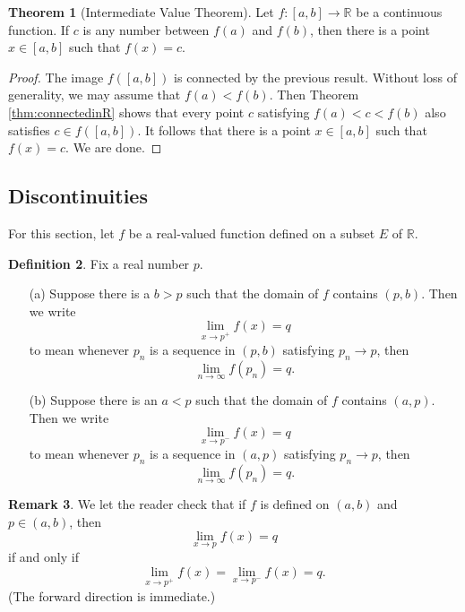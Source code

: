 \documentclass[12pt]{article}
\theoremstyle{definition}
\newtheorem{definition}{Definition}
\newtheorem{remark}[definition]{Remark}
\theoremstyle{theorem}
\newtheorem{theorem}[definition]{Theorem}
\begin{document}
\begin{theorem}[Intermediate Value Theorem]
Let $f : [a,b] \to \mathbb{R}$ be a continuous function. If $c$ is any number between $f(a)$ and $f(b)$, then there is a point $x \in [a,b]$ such that $f(x) = c$. 
\end{theorem}

\begin{proof}
The image $f([a,b])$ is connected by the previous result. Without loss of generality, we may assume that $f(a) < f(b)$. Then Theorem \ref{thm:connectedinR} shows that every point $c$ satisfying $f(a) < c < f(b)$ also satisfies $c \in f([a,b])$. It follows that there is a point $x \in [a,b]$ such that $f(x) = c$. We are done.  
\end{proof}

\subsection{Discontinuities}

For this section, let $f$ be a real-valued function defined on a subset $E$ of $\mathbb{R}$. 

\begin{definition}
Fix a real number $p$.  
\begin{enumerate}
\item[(a)] Suppose there is a $b > p$ such that the domain of $f$ contains $(p,b)$.  Then we write
\[
\lim_{x \to p^+}f(x) = q
\]
to mean whenever $p_n$ is a sequence in $(p,b)$ satisfying $p_n \to p$, then 
\[
\lim_{n \to \infty}f(p_n) = q.
\]
\item[(b)] Suppose there is an $a < p$ such that the domain of $f$ contains $(a,p)$. Then we write 
\[
\lim_{x \to p^-} f(x) = q
\]
to mean whenever $p_n$ is a sequence in $(a,p)$ satisfying $p_n \to p$, then 
\[
\lim_{n \to \infty} f(p_n) = q.
\]
\end{enumerate}

\end{definition}

\begin{remark}
We let the reader check that if $f$ is defined on $(a,b)$ and $p \in (a,b)$, then
\[
\lim_{x \to p} f(x) = q
\]
if and only if 
\[
\lim_{x \to p^+} f(x)= \lim_{x \to p^-} f(x) = q.
\]
(The forward direction is immediate.)
\end{remark}
\end{document}
